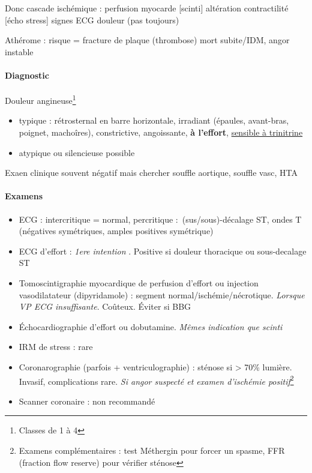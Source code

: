 Donc cascade ischémique : \dec perfusion myocarde [scinti] \thus altération
contractilité [écho stress] \thus signes ECG \thus douleur (pas toujours)

Athérome : risque = fracture de plaque \thus (thrombose) mort subite/IDM, angor
instable

\paragraph{Diagnostic}
Douleur angineuse\footnote{Classes de 1 à 4}
\begin{itemize}
  \item typique : rétrosternal en barre horizontale, irradiant (épaules,
    avant-bras, poignet, machoîres), constrictive, angoissante, \textbf{à
    l'effort}, \underline{sensible à trinitrine}
  \item atypique ou silencieuse possible
\end{itemize}
Exaen clinique souvent négatif mais chercher souffle aortique, souffle vasc, HTA

\paragraph{Examens}
\begin{itemize}
  \item ECG : intercritique = normal, percritique : (sus/sous)-décalage
    ST, ondes T (négatives symétriques, amples positives symétrique)
  \item ECG d'effort : \textit{1ere intention} . Positive si douleur thoracique ou
    sous-decalage ST
  \item Tomoscintigraphie myocardique de perfusion d'effort ou injection
    vasodilatateur (dipyridamole) : segment normal/ischémie/nécrotique.
    \textit{Lorsque VP ECG insuffisante}. Coûteux. Éviter si \gls{BBG}
  \item Échocardiographie d'effort ou dobutamine. \textit{Mêmes indication que
    scinti} 
  \item IRM de stress : rare
  \item Coronarographie (parfois + ventriculographie) : sténose si > 70\%
    lumière. Invasif, complications rare. \textit{Si angor suspecté et examen
    d'ischémie positif}\footnote{Examens complémentaires : test Méthergin pour
      forcer un spasme, FFR (fraction flow reserve) pour vérifier sténose}
  \item Scanner coronaire : non recommandé
\end{itemize}


